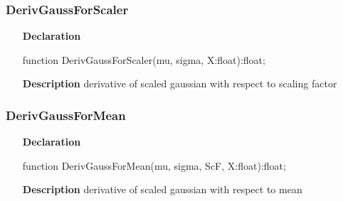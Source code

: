 \documentclass[12pt,a4paper,oneside]{report}
\newcommand{\declarationitem}[1]{\textbf{#1}}
\newcommand{\descriptiontitle}[1]{\textbf{#1}}
\begin{document}
\subsubsection{DerivGaussForScaler}
\label{ugauss-DerivGaussForScaler}
\begin{itemize}\item[\declarationitem{Declaration}\hfill]
	\begin{flushleft}
		\begin{ttfamily}
			function DerivGaussForScaler(mu, sigma, X:float):float;\end{ttfamily}
		
	\end{flushleft}
	
	\par
	\item[\descriptiontitle{Description}]
	derivative of scaled gaussian with respect to scaling factor
	
\end{itemize}
\subsubsection{DerivGaussForMean}
\label{ugauss-DerivGaussForMean}
\begin{itemize}\item[\declarationitem{Declaration}\hfill]
	\begin{flushleft}
		\begin{ttfamily}
			function DerivGaussForMean(mu, sigma, ScF, X:float):float;\end{ttfamily}
		
	\end{flushleft}
	
	\par
	\item[\descriptiontitle{Description}]
	derivative of scaled gaussian with respect to mean
	
\end{itemize}
\end{document}

